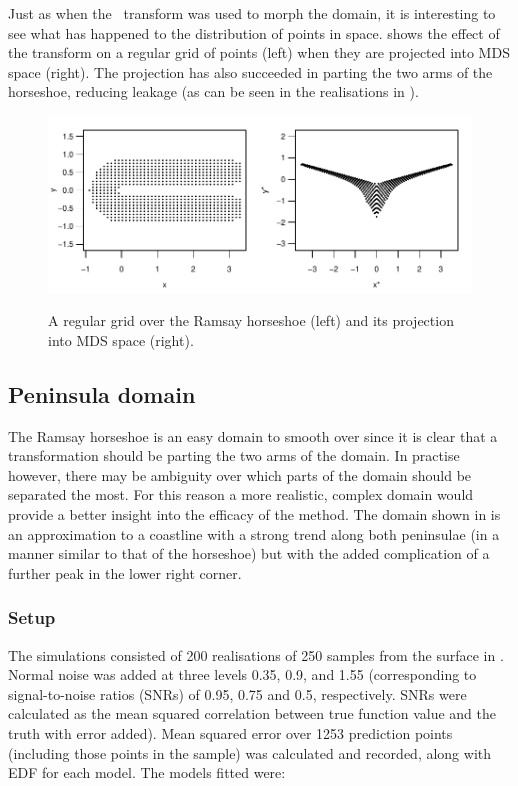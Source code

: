 Just as when the \sch\ transform was used to morph the domain, it is interesting to see what has happened to the distribution of points in space.  shows the effect of the transform on a regular grid of points (left) when they are projected into MDS space (right). The projection has also succeeded in parting the two arms of the horseshoe, reducing leakage (as can be seen in the realisations in ).

\begin{figure}
\centering
\includegraphics[width=6in]{mds/figs/mdsrampoints.pdf} \\
\caption{A regular grid over the Ramsay horseshoe (left) and its projection into MDS space (right).}
\label{mdsrampoints}
\end{figure}


\subsection{Peninsula domain}
\label{mds-wt2-sim}

The Ramsay horseshoe is an easy domain to smooth over since it is clear that a transformation should be parting the two arms of the domain. In practise however, there may be ambiguity over which parts of the domain should be separated the most. For this reason a more realistic, complex domain would provide a better insight into the efficacy of the method. The domain shown in  is an approximation to a coastline with a strong trend along both peninsulae (in a manner similar to that of the horseshoe) but with the added complication of a further peak in the lower right corner.

\subsubsection{Setup}

The simulations consisted of 200 realisations of 250 samples from the surface in . Normal noise was added at three levels  0.35, 0.9, and 1.55 (corresponding to signal-to-noise ratios (SNRs) of 0.95, 0.75 and 0.5, respectively. SNRs were calculated as the mean squared correlation between true function value and the truth with error added). Mean squared error over 1253 prediction points (including those points in the sample) was calculated and recorded, along with EDF for each model. The models fitted were:

